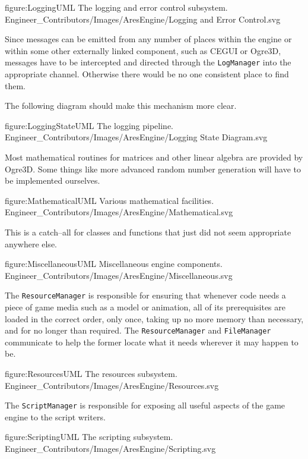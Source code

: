 \FullPageDiagram
    {figure:LoggingUML}
    {The logging and error control subsystem.}
    {Engineer_Contributors/Images/AresEngine/Logging and Error Control.svg}
    
Since messages can be emitted from any number of places within the engine or within some other externally linked component, such as CEGUI or Ogre3D, messages have to be intercepted and directed through the {\tt LogManager} into the appropriate channel. Otherwise there would be no one consistent place to find them. 

The following diagram should make this mechanism more clear.

\FullPageDiagram
    {figure:LoggingStateUML}
    {The logging pipeline.}
    {Engineer_Contributors/Images/AresEngine/Logging State Diagram.svg}

\page 
{}
Most mathematical routines for matrices and other linear algebra are provided by Ogre3D. Some things like more advanced random number generation will have to be implemented ourselves.

\FullPageDiagram
    {figure:MathematicalUML}
    {Various mathematical facilities.}
    {Engineer_Contributors/Images/AresEngine/Mathematical.svg}

\page 
{}
This is a catch--all for classes and functions that just did not seem appropriate anywhere else.

\FullPageDiagram
    {figure:MiscellaneousUML}
    {Miscellaneous engine components.}
    {Engineer_Contributors/Images/AresEngine/Miscellaneous.svg}

\page 
{}
The {\tt ResourceManager} is responsible for ensuring that whenever code needs a piece of game media such as a model or animation, all of its prerequisites are loaded in the correct order, only once, taking up no more memory than necessary, and for no longer than required. The {\tt ResourceManager} and {\tt FileManager} communicate to help the former locate what it needs wherever it may happen to be.

\FullPageDiagram
    {figure:ResourcesUML}
    {The resources subsystem.}
    {Engineer_Contributors/Images/AresEngine/Resources.svg}

\page 
{}
The {\tt ScriptManager} is responsible for exposing all useful aspects of the game engine to the script writers.

\FullPageDiagram
    {figure:ScriptingUML}
    {The scripting subsystem.}
    {Engineer_Contributors/Images/AresEngine/Scripting.svg}

